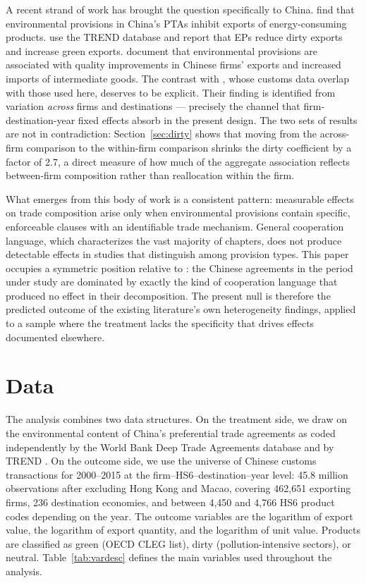 \documentclass[12pt]{article}
\begin{document}
A recent strand of work has brought the question specifically to China. \citet{yue2024} find that environmental provisions in China's PTAs inhibit exports of energy-consuming products. \citet{zhusun2026} use the TREND database and report that EPs reduce dirty exports and increase green exports. \citet{zhusun2025} document that environmental provisions are associated with quality improvements in Chinese firms' exports and increased imports of intermediate goods. The contrast with \citet{zhusun2026}, whose customs data overlap with those used here, deserves to be explicit. Their finding is identified from variation \emph{across} firms and destinations --- precisely the channel that firm-destination-year fixed effects absorb in the present design. The two sets of results are not in contradiction: Section~\ref{sec:dirty} shows that moving from the across-firm comparison to the within-firm comparison shrinks the dirty coefficient by a factor of 2.7, a direct measure of how much of the aggregate association reflects between-firm composition rather than reallocation within the firm.

What emerges from this body of work is a consistent pattern: measurable effects on trade composition arise only when environmental provisions contain specific, enforceable clauses with an identifiable trade mechanism. General cooperation language, which characterizes the vast majority of chapters, does not produce detectable effects in studies that distinguish among provision types. This paper occupies a symmetric position relative to \citet{brandi2020}: the Chinese agreements in the period under study are dominated by exactly the kind of cooperation language that produced no effect in their decomposition. The present null is therefore the predicted outcome of the existing literature's own heterogeneity findings, applied to a sample where the treatment lacks the specificity that drives effects documented elsewhere.

\section{Data}\label{sec:background}

The analysis combines two data structures. On the treatment side, we draw on the
environmental content of China's preferential trade agreements as coded independently by
the World Bank Deep Trade Agreements database \citep{hofmann2017} and by TREND
\citep{morin2017}. On the outcome side, we use the universe of Chinese customs
transactions for 2000--2015 at the firm--HS6--destination--year level: 45.8 million
observations after excluding Hong Kong and Macao, covering 462{,}651 exporting firms,
236 destination economies, and between 4{,}450 and 4{,}766 HS6 product codes depending
on the year. The outcome variables are the logarithm of export value, the logarithm
of export quantity, and the logarithm of unit value. Products are classified as green
(OECD CLEG list), dirty (pollution-intensive sectors), or neutral. Table~\ref{tab:vardesc}
defines the main variables used throughout the analysis.
\end{document}
